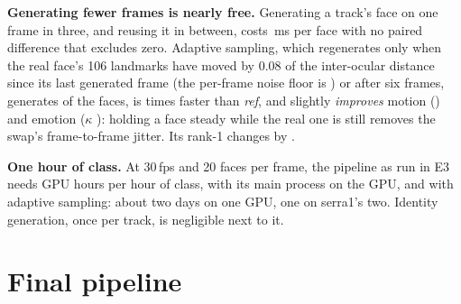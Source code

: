 \textbf{Generating fewer frames is nearly free.} Generating a track's face on one
frame in three, and reusing it in between, costs
\,ms per face with no paired difference
that excludes zero. Adaptive sampling, which regenerates only when the real
face's 106 landmarks have moved by 0.08 of the inter-ocular distance since its
last generated frame (the per-frame noise floor is )
or after six frames, generates
 of the faces, is
 times faster than \emph{ref}, and slightly
\emph{improves} motion () and emotion
($\kappa$ ): holding a face steady while
the real one is still removes the swap's frame-to-frame jitter. Its rank-1
changes by .

\textbf{One hour of class.} At 30\,fps and 20 faces per frame, the pipeline as
run in E3 needs  GPU hours per hour of
class,  with its main process on the GPU, and
 with adaptive sampling: about two days
on one GPU, one on serra1's two. Identity generation, once per track, is
negligible next to it.

\section{Final pipeline}
\label{sec:final}

